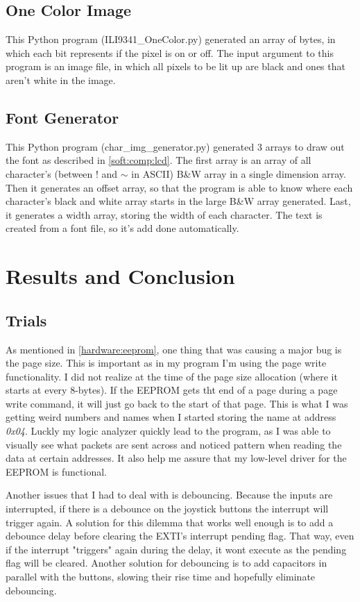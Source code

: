 \documentclass[12pt, a4paper]{article}
\begin{document}
    \subsection{One Color Image} \label{python:oncolor}
    This Python program (ILI9341\_OneColor.py) generated an array of bytes, in which each bit represents if the pixel is on or off. The input argument to this program is an image file, in which all pixels to be lit up are black and ones that aren't white in the image.
    \subsection{Font Generator}
    This Python program (char\_img\_generator.py) generated 3 arrays to draw out the font as described in \cref{soft:comp:lcd}. The first array is an array of all character's (between ! and $\sim$ in ASCII) B\&W array in a single dimension array. Then it generates an offset array, so that the program is able to know where each character's black and white array starts in the large B\&W array generated. Last, it generates a width array, storing the width of each character. The text is created from a font file, so it's add done automatically. 
    
    \section{Results and Conclusion}
    \subsection{Trials} \label{conc:strugle}
    As mentioned in \cref{hardware:eeprom}, one thing that was causing a major bug is the page size. This is important as in my program I'm using the page write functionality. I did not realize at the time of the page size allocation (where it starts at every 8-bytes). If the EEPROM gets tht end of a page during a page write command, it will just go back to the start of that page. This is what I was getting weird numbers and names when I started storing the name at address \textit{0x04}. Luckly my logic analyzer quickly lead to the program, as I was able to visually see what packets are sent across and noticed pattern when reading the data at certain addresses. It also help me assure that my low-level driver for the EEPROM is functional. 
    
    Another issues that I had to deal with is debouncing. Because the inputs are interrupted, if there is a debounce on the joystick buttons the interrupt will trigger again. A solution for this dilemma that works well enough is to add a debounce delay before clearing the EXTI's interrupt pending flag. That way, even if the interrupt "triggers" again during the delay, it wont execute as the pending flag will be cleared. Another solution for debouncing is to add capacitors in parallel with the buttons, slowing their rise time and hopefully eliminate debouncing. 
    
\end{document}
